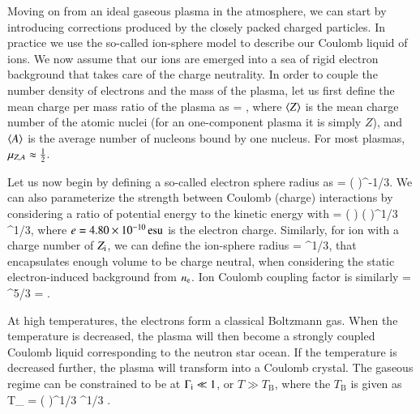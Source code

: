 Moving on from an ideal gaseous plasma in the atmosphere, we can start by introducing corrections produced by the closely packed charged particles.
In practice we use the so-called ion-sphere model to describe our Coulomb liquid of ions.
We now assume that our ions are emerged into a sea of rigid electron background that takes care of the charge neutrality.
In order to couple the number density of electrons and the mass of the plasma, let us first define the mean charge per mass ratio of the plasma as
\be
\Mu = ,
\ee
where $\langle Z \rangle$ is the mean charge number of the atomic nuclei (for an one-component plasma it is simply $Z$), and $\langle A \rangle$ is the average number of nucleons bound by one nucleus.
For most plasmas, $\mu_{Z,A} \approx \frac{1}{2}$.

Let us now begin by defining a so-called electron sphere radius as
\be
\erad = \left(  \right)^{-1/3}.
\ee
We can also parameterize the strength between Coulomb (charge) interactions by considering a ratio of potential energy to the kinetic energy with
\be
\Ge =   \left(  \right) \left(  \right)^{1/3} \Mu^{1/3},
\ee
where $e = 4.80 \times 10^{-10} \, \mathrm{esu}$ is the electron charge.
Similarly, for ion with a charge number of $Z_{\mathrm{i}}$, we can define the ion-sphere radius
\be
\irad = \erad \Zi^{1/3},
\ee
that encapsulates enough volume to be charge neutral, when considering the static electron-induced background from $n_{\mathrm{e}}$.
Ion Coulomb coupling factor is similarly
\be
\Gi = \Ge \Zi^{5/3} = .
\ee

At high temperatures, the electrons form a classical Boltzmann gas.
When the temperature is decreased, the plasma will then become a strongly coupled Coulomb liquid corresponding to the neutron star ocean.
If the temperature is decreased further, the plasma will transform into a Coulomb crystal. %
The gaseous regime can be constrained to be at $\Gamma_{\mathrm{i}} \ll 1$, or $T \gg T_{\mathrm{B}}$, where the $T_{\mathrm{B}}$ is given as
\be
T_{} =  \approx {} \left(  \right)^{1/3} \Mu^{1/3} \Kelvin.
\ee

